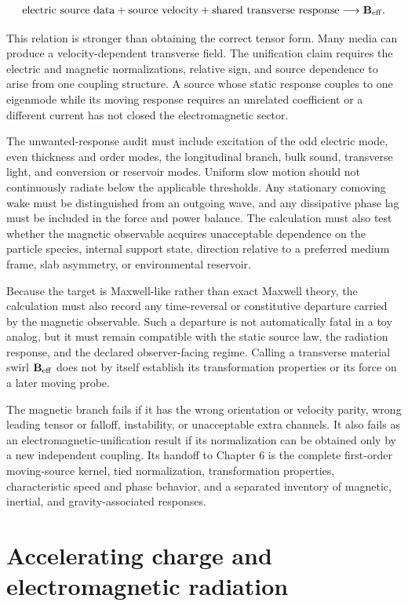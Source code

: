 \[
\text{electric source data}
+\text{source velocity}
+\text{shared transverse response}
\longrightarrow
\mathbf B_{\rm eff}.
\]

This relation is stronger than obtaining the correct tensor form. Many media can
produce a velocity-dependent transverse field. The unification claim requires
the electric and magnetic normalizations, relative sign, and source dependence
to arise from one coupling structure. A source whose static response couples to
one eigenmode while its moving response requires an unrelated coefficient or a
different current has not closed the electromagnetic sector.

The unwanted-response audit must include excitation of the odd electric mode,
even thickness and order modes, the longitudinal branch, bulk sound, transverse
light, and conversion or reservoir modes. Uniform slow motion should not
continuously radiate below the applicable thresholds. Any stationary comoving
wake must be distinguished from an outgoing wave, and any dissipative phase lag
must be included in the force and power balance. The calculation must also test
whether the magnetic observable acquires unacceptable dependence on the
particle species, internal support state, direction relative to a preferred
medium frame, slab asymmetry, or environmental reservoir.

Because the target is Maxwell-like rather than exact Maxwell theory, the
calculation must also record any time-reversal or constitutive departure carried
by the magnetic observable. Such a departure is not automatically fatal in a
toy analog, but it must remain compatible with the static source law, the
radiation response, and the declared observer-facing regime. Calling a
transverse material swirl \(\mathbf B_{\rm eff}\) does not by itself establish
its transformation properties or its force on a later moving probe.

The magnetic branch fails if it has the wrong orientation or velocity parity,
wrong leading tensor or falloff, instability, or unacceptable extra channels.
It also fails as an electromagnetic-unification result if its normalization can
be obtained only by a new independent coupling. Its handoff to Chapter 6 is the
complete first-order moving-source kernel, tied normalization, transformation
properties, characteristic speed and phase behavior, and a separated inventory
of magnetic, inertial, and gravity-associated responses.

\section{Accelerating charge and electromagnetic radiation}

